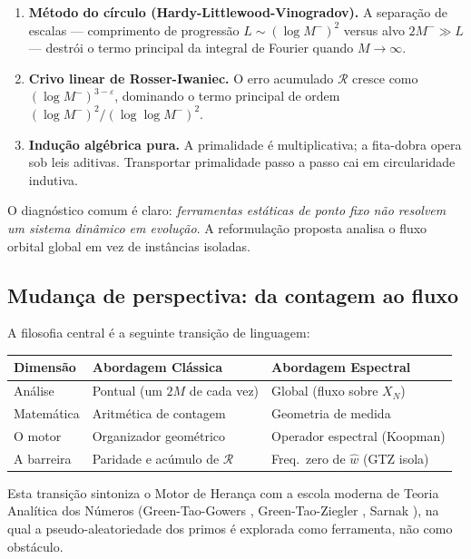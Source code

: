 \documentclass[12pt,a4paper]{article}
\theoremstyle{definition}
\begin{document}
	\begin{enumerate}[label=(\roman*)]
		\item \textbf{Método do círculo (Hardy-Littlewood-Vinogradov).} A
		separação de escalas — comprimento de progressão
		$L \sim (\log M^-)^2$ versus alvo $2M^- \gg L$ — destrói o
		termo principal da integral de Fourier quando $M \to \infty$.
		
		\item \textbf{Crivo linear de Rosser-Iwaniec.} O erro acumulado
		$\mathcal{R}$ cresce como $(\log M^-)^{3-\varepsilon}$, dominando
		o termo principal de ordem $(\log M^-)^2 / (\log\log M^-)^2$.
		
		\item \textbf{Indução algébrica pura.} A primalidade é
		multiplicativa; a fita-dobra opera sob leis aditivas. Transportar
		primalidade passo a passo cai em circularidade indutiva.
	\end{enumerate}
	
	O diagnóstico comum é claro: \emph{ferramentas estáticas de ponto
		fixo não resolvem um sistema dinâmico em evolução}. A reformulação
	proposta analisa o fluxo orbital global em vez de instâncias
	isoladas.
	
	\subsection{Mudança de perspectiva: da contagem ao fluxo}
	
	A filosofia central é a seguinte transição de linguagem:
	
	\begin{center}
		\renewcommand{\arraystretch}{1.4}
		\begin{tabular}{lll}
			\toprule
			\textbf{Dimensão} & \textbf{Abordagem Clássica} & \textbf{Abordagem Espectral} \\
			\midrule
			Análise & Pontual (um $2M$ de cada vez) & Global (fluxo sobre $X_N$) \\
			Matemática & Aritmética de contagem & Geometria de medida \\
			O motor & Organizador geométrico & Operador espectral (Koopman) \\
			A barreira & Paridade e acúmulo de $\mathcal{R}$ & Freq.\ zero de $\widehat{w}$ (GTZ isola) \\
			\bottomrule
		\end{tabular}
	\end{center}
	
	Esta transição sintoniza o Motor de Herança com a escola moderna de
	Teoria Analítica dos Números (Green-Tao-Gowers \cite{greentao},
	Green-Tao-Ziegler \cite{greentaoziegler}, Sarnak \cite{sarnak}),
	na qual a pseudo-aleatoriedade dos primos é explorada como
	ferramenta, não como obstáculo.
	
\end{document}
